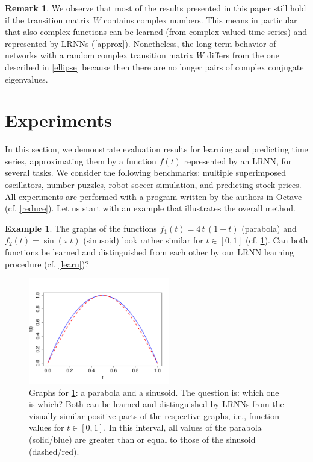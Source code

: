 \documentclass[twoside,11pt]{article}
\theoremstyle{definition}
\newtheorem{exmp}{Example}
\newtheorem{remk}{Remark}
\begin{document}
\begin{remk}
We observe that most of the results presented in this paper still
hold if the transition matrix $W$ contains complex numbers. This means in
particular that also complex functions can be learned (from complex-valued time
series) and represented by LRNNs (\cref{approx}).
Nonetheless, the long-term behavior of networks with a random complex transition
matrix $W$ differs from the one described in \cref{ellipse} because then
there are no longer pairs of complex conjugate eigenvalues.
\end{remk}

\section{Experiments}\label{result}

In this section, we demonstrate evaluation results for learning and predicting
time series, approximating them by a function $f(t)$ represented by an LRNN,
for several tasks. We consider the following benchmarks: multiple superimposed
oscillators, number puzzles, robot soccer simulation, and predicting stock
prices. All experiments are performed with a program written by the authors in
Octave \citep{EB+17} (cf. \cref{reduce}). Let us start with an example that
illustrates the overall method.

\begin{exmp}\label{quest}
The graphs of the functions $f_1(t) = 4\,t\,(1-t)$ (parabola) and $f_2(t) =
\sin(\pi\,t)$ (sinusoid) look rather similar for $t \in [0,1]$ (cf.
\cref{parasin}). Can both functions be learned and distinguished from each other
by our LRNN learning procedure (cf. \cref{learn})?
\end{exmp}

\begin{figure}
        \centering
	\includegraphics[width=0.55\textwidth]{fig/parasin2} %
	\caption{Graphs for \cref{quest}: a parabola and a sinusoid.
	The question is: which one is which? Both can be learned and
	distinguished by LRNNs from the visually similar positive parts of the
	respective graphs, i.e., function values for $t \in [0, 1]$. In this
	interval, all values of the parabola (solid/blue) are greater than or equal
	to those of the sinusoid (dashed/red).}
	\label{parasin}
\end{figure}
\end{document}
